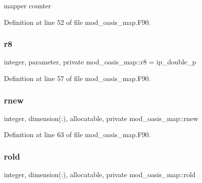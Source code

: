 mapper counter 



Definition at line 52 of file mod\+\_\+oasis\+\_\+map.\+F90.

\mbox{\label{namespacemod__oasis__map_a30ebe320b9e4c06a1ee1f2a0bbacf2c4}} 
\subsubsection{\texorpdfstring{r8}{r8}}
{\footnotesize\ttfamily integer, parameter, private mod\+\_\+oasis\+\_\+map\+::r8 = ip\+\_\+double\+\_\+p\hspace{0.3cm}{\ttfamily [private]}}



Definition at line 57 of file mod\+\_\+oasis\+\_\+map.\+F90.

\mbox{\label{namespacemod__oasis__map_a2575785d3ea5e1a37c7f6303f00eb727}} 
\subsubsection{\texorpdfstring{rnew}{rnew}}
{\footnotesize\ttfamily integer, dimension(\+:), allocatable, private mod\+\_\+oasis\+\_\+map\+::rnew\hspace{0.3cm}{\ttfamily [private]}}



Definition at line 63 of file mod\+\_\+oasis\+\_\+map.\+F90.

\mbox{\label{namespacemod__oasis__map_a2931a6f582d0173cc0e6b155b8cb55b7}} 
\subsubsection{\texorpdfstring{rold}{rold}}
{\footnotesize\ttfamily integer, dimension(\+:), allocatable, private mod\+\_\+oasis\+\_\+map\+::rold\hspace{0.3cm}{\ttfamily [private]}}



